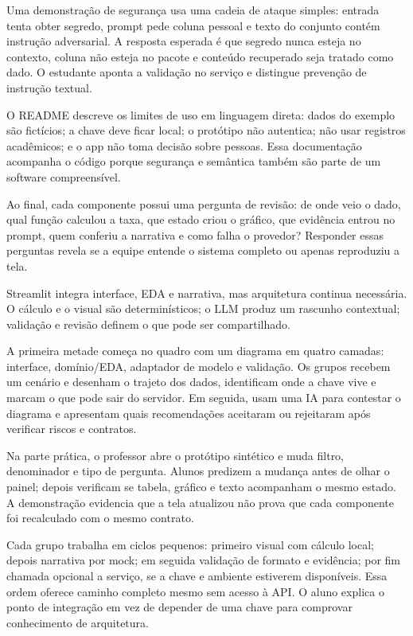 Uma demonstração de segurança usa uma cadeia de ataque simples: entrada tenta obter segredo, prompt pede coluna pessoal e texto do conjunto contém instrução adversarial. A resposta esperada é que segredo nunca esteja no contexto, coluna não esteja no pacote e conteúdo recuperado seja tratado como dado. O estudante aponta a validação no serviço e distingue prevenção de instrução textual.

O README descreve os limites de uso em linguagem direta: dados do exemplo são fictícios; a chave deve ficar local; o protótipo não autentica; não usar registros acadêmicos; e o app não toma decisão sobre pessoas. Essa documentação acompanha o código porque segurança e semântica também são parte de um software compreensível.

Ao final, cada componente possui uma pergunta de revisão: de onde veio o dado, qual função calculou a taxa, que estado criou o gráfico, que evidência entrou no prompt, quem conferiu a narrativa e como falha o provedor? Responder essas perguntas revela se a equipe entende o sistema completo ou apenas reproduziu a tela.

\begin{SummaryBox}
Streamlit integra interface, EDA e narrativa, mas arquitetura continua necessária. O cálculo e o visual são determinísticos; o LLM produz um rascunho contextual; validação e revisão definem o que pode ser compartilhado.
\end{SummaryBox}



A primeira metade começa no quadro com um diagrama em quatro camadas: interface, domínio/EDA, adaptador de modelo e validação. Os grupos recebem um cenário e desenham o trajeto dos dados, identificam onde a chave vive e marcam o que pode sair do servidor. Em seguida, usam uma IA para contestar o diagrama e apresentam quais recomendações aceitaram ou rejeitaram após verificar riscos e contratos.

Na parte prática, o professor abre o protótipo sintético e muda filtro, denominador e tipo de pergunta. Alunos predizem a mudança antes de olhar o painel; depois verificam se tabela, gráfico e texto acompanham o mesmo estado. A demonstração evidencia que a tela atualizou não prova que cada componente foi recalculado com o mesmo contrato.

Cada grupo trabalha em ciclos pequenos: primeiro visual com cálculo local; depois narrativa por mock; em seguida validação de formato e evidência; por fim chamada opcional a serviço, se a chave e ambiente estiverem disponíveis. Essa ordem oferece caminho completo mesmo sem acesso à API. O aluno explica o ponto de integração em vez de depender de uma chave para comprovar conhecimento de arquitetura.

